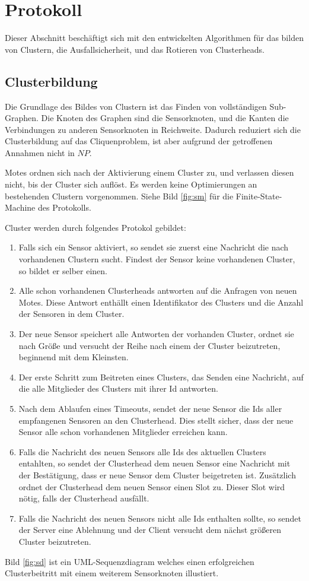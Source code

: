 \section{Protokoll} \label{sec:algo}
Dieser Abschnitt besch\"aftigt sich mit den entwickelten Algorithmen f\"ur das bilden von Clustern, die Ausfallsicherheit, und das Rotieren von Clusterheads.

\subsection{Clusterbildung}
Die Grundlage des Bildes von Clustern ist das Finden von vollst\"andigen Sub-Graphen.
Die Knoten des Graphen sind die Sensorknoten, und die Kanten die Verbindungen zu anderen Sensorknoten in Reichweite.
Dadurch reduziert sich die Clusterbildung auf das Cliquenproblem, ist aber aufgrund der getroffenen Annahmen nicht in $NP$.

Motes ordnen sich nach der Aktivierung einem Cluster zu, und verlassen diesen nicht, bis der Cluster sich aufl\"ost. Es werden keine Optimierungen an bestehenden Clustern vorgenommen.
Siehe Bild \ref{fig:sm} f\"ur die Finite-State-Machine des Protokolls.

Cluster werden durch folgendes Protokol gebildet:
\begin{enumerate}
\item Falls sich ein Sensor aktiviert, so sendet sie zuerst eine Nachricht die nach vorhandenen Clustern sucht. Findest der Sensor keine vorhandenen Cluster, so bildet er selber einen.
\item Alle schon vorhandenen Clusterheads antworten auf die Anfragen von neuen Motes. Diese Antwort enth\"allt einen Identifikator des Clusters und die Anzahl der Sensoren in dem Cluster.
\item Der neue Sensor speichert alle Antworten der vorhanden Cluster, ordnet sie nach Gr\"o\ss e und versucht der Reihe nach einem der Cluster beizutreten, beginnend mit dem Kleinsten.
\item Der erste Schritt zum Beitreten eines Clusters, das Senden eine Nachricht, auf die alle Mitglieder des Clusters mit ihrer Id antworten.
\item Nach dem Ablaufen eines Timeouts, sendet der neue Sensor die Ids aller empfangenen Sensoren an den Clusterhead. Dies stellt sicher, dass der neue Sensor alle schon vorhandenen Mitglieder erreichen kann.
\item Falls die Nachricht des neuen Sensors alle Ids des aktuellen Clusters entahlten, so sendet der Clusterhead dem neuen Sensor eine Nachricht mit der Best\"atigung, dass er neue Sensor dem Cluster beigetreten ist. Zus\"atzlich ordnet der Clusterhead dem neuen Sensor einen Slot zu. Dieser Slot wird n\"otig, falls der Clusterhead ausf\"allt.
\item Falls die Nachricht des neuen Sensors nicht alle Ids enthalten sollte, so sendet der Server eine Ablehnung und der Client versucht dem n\"achst gr\"o\ss eren Cluster beizutreten.
\end{enumerate}
Bild \ref{fig:sd} ist ein UML-Sequenzdiagram welches einen erfolgreichen Clusterbeitritt mit einem weiterem Sensorknoten illustiert.


